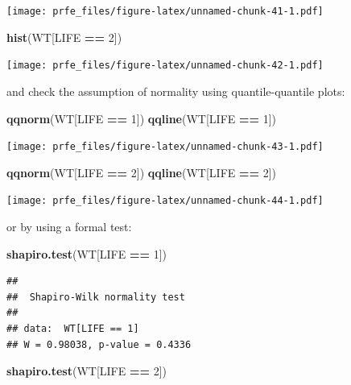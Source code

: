 \documentclass[]{book}
\newenvironment{Shaded}{\begin{snugshade}}{\end{snugshade}}
\newcommand{\KeywordTok}[1]{\textcolor[rgb]{0.13,0.29,0.53}{\textbf{#1}}}
\newcommand{\DecValTok}[1]{\textcolor[rgb]{0.00,0.00,0.81}{#1}}
\newcommand{\StringTok}[1]{\textcolor[rgb]{0.31,0.60,0.02}{#1}}
\newcommand{\OperatorTok}[1]{\textcolor[rgb]{0.81,0.36,0.00}{\textbf{#1}}}
\newcommand{\NormalTok}[1]{#1}
\theoremstyle{definition}
\theoremstyle{definition}
\theoremstyle{definition}
\theoremstyle{remark}
\begin{document}
\texttt{[image: prfe\_files/figure-latex/unnamed-chunk-41-1.pdf]}

\begin{Shaded}
\begin{Highlighting}[]
\KeywordTok{hist}\NormalTok{(WT[LIFE }\OperatorTok{==}\StringTok{ }\DecValTok{2}\NormalTok{])}
\end{Highlighting}
\end{Shaded}

\texttt{[image: prfe\_files/figure-latex/unnamed-chunk-42-1.pdf]}

and check the assumption of normality using quantile-quantile plots:

\begin{Shaded}
\begin{Highlighting}[]
\KeywordTok{qqnorm}\NormalTok{(WT[LIFE }\OperatorTok{==}\StringTok{ }\DecValTok{1}\NormalTok{])}
\KeywordTok{qqline}\NormalTok{(WT[LIFE }\OperatorTok{==}\StringTok{ }\DecValTok{1}\NormalTok{])}
\end{Highlighting}
\end{Shaded}

\texttt{[image: prfe\_files/figure-latex/unnamed-chunk-43-1.pdf]}

\begin{Shaded}
\begin{Highlighting}[]
\KeywordTok{qqnorm}\NormalTok{(WT[LIFE }\OperatorTok{==}\StringTok{ }\DecValTok{2}\NormalTok{])}
\KeywordTok{qqline}\NormalTok{(WT[LIFE }\OperatorTok{==}\StringTok{ }\DecValTok{2}\NormalTok{])}
\end{Highlighting}
\end{Shaded}

\texttt{[image: prfe\_files/figure-latex/unnamed-chunk-44-1.pdf]}

or by using a formal test:

\begin{Shaded}
\begin{Highlighting}[]
\KeywordTok{shapiro.test}\NormalTok{(WT[LIFE }\OperatorTok{==}\StringTok{ }\DecValTok{1}\NormalTok{])}
\end{Highlighting}
\end{Shaded}

\begin{verbatim}
## 
##  Shapiro-Wilk normality test
## 
## data:  WT[LIFE == 1]
## W = 0.98038, p-value = 0.4336
\end{verbatim}

\begin{Shaded}
\begin{Highlighting}[]
\KeywordTok{shapiro.test}\NormalTok{(WT[LIFE }\OperatorTok{==}\StringTok{ }\DecValTok{2}\NormalTok{])}
\end{Highlighting}
\end{Shaded}
\end{document}
